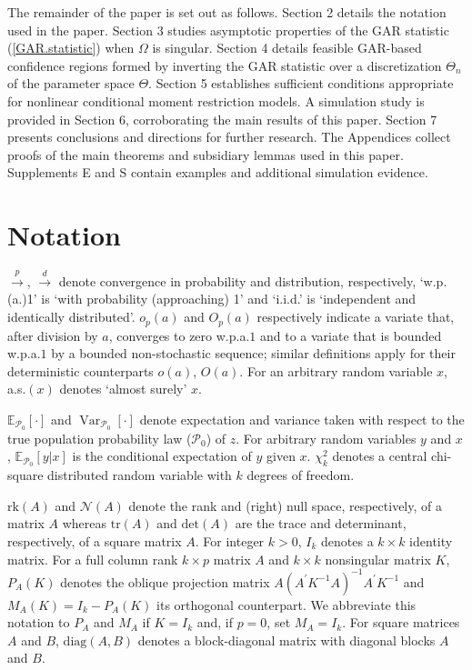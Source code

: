 \documentclass[hidelinks, 11 pt, a4paper, pdflatex]{article}
\DeclareMathOperator{\Var}{Var}
\begin{document}
{  The remainder of the paper is set out as follows. Section 2 details the notation used in the paper. Section 3 studies asymptotic properties of the GAR statistic (\ref{GAR.statistic}) when $\Omega$ is singular. Section 4 details feasible GAR-based confidence regions formed by inverting the GAR statistic over a discretization $\Theta_n$ of the parameter space $\Theta$. Section 5 establishes sufficient conditions appropriate for nonlinear conditional moment restriction models. A simulation study is provided in Section 6, corroborating the main results of this paper. Section 7 presents conclusions and directions for further research. The Appendices collect proofs of the main theorems and subsidiary lemmas used in this paper. Supplements E and S contain examples and additional simulation evidence.



 \section{Notation}

  \setcounter{equation}{0}

  \indent $\overset{p}{\rightarrow}$, $\overset{d}{\rightarrow}$ denote convergence in probability and distribution, respectively, `w.p.(a.)1' is `with probability (approaching) 1' and `i.i.d.' is `independent and identically distributed'. $o_p(a)$ and $O_p(a)$ respectively indicate a variate that, after division by $a$, converges to zero w.p.a.$1$ and to a variate that is bounded w.p.a.$1$ by a bounded non-stochastic sequence; similar definitions apply for their deterministic counterparts $o(a)$, $O(a)$. For an arbitrary random variable $x$, a.s.$(x)$ denotes `almost surely' $x$.
  
  $\mathbb{E}_{\mathcal{P}_0}[\cdot]$ and $\Var_{\mathcal{P}_0}[\cdot]$ denote expectation and variance taken with respect to the true population probability law ($\mathcal{P}_0$) of $z$. For arbitrary random variables $y$ and $x$, $\mathbb{E}_{\mathcal{P}_0}[y|x]$ is the conditional expectation of $y$ given $x$. $\chi_{k}^{2}$ denotes a central chi-square distributed random variable with $k$ degrees of freedom.

  $\mathrm{rk}(A)$ and $\mathcal{N}(A)$ denote the rank and (right) null space, respectively, of a matrix $A$ whereas $\mathrm{tr}(A)$ and $\mathrm{det}(A)$ are the trace and determinant, respectively, of a square matrix $A$.  For integer $k > 0$, $I_{k}$ denotes a $k \times k$ identity matrix. For a full column rank $k \times p$ matrix $A$ and $k \times k$ nonsingular matrix $K$, $P_{A}(K)$ denotes the oblique projection matrix $A(A^{\prime}K^{-1}A)^{-1}A^{\prime}K^{-1}$ and $M_{A}(K) = I_{k} - P_{A}(K)$ its orthogonal counterpart. We abbreviate this notation to $P_{A}$ and $M_{A}$ if $K = I_{k}$ and, if $p = 0$, set $M_{A} = I_{k}$. For square matrices $A$ and $B$, $\mathrm{diag}(A,B)$ denotes a block-diagonal matrix with diagonal blocks $A$ and $B$.

}
\end{document}

